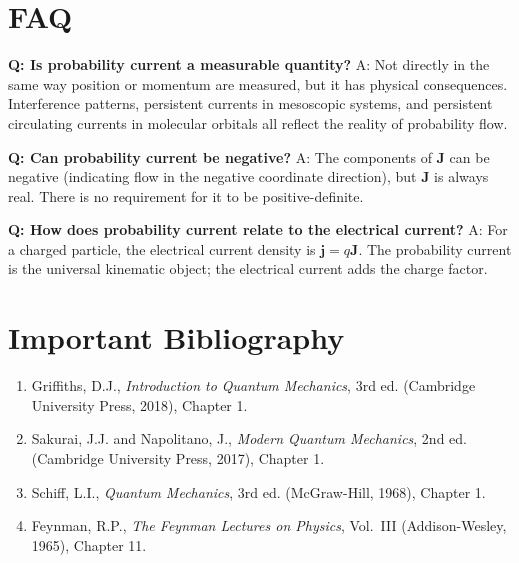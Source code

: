 \section*{FAQ}

\textbf{Q: Is probability current a measurable quantity?}
A: Not directly in the same way position or momentum are measured, but it has physical consequences. Interference patterns, persistent currents in mesoscopic systems, and persistent circulating currents in molecular orbitals all reflect the reality of probability flow.

\textbf{Q: Can probability current be negative?}
A: The components of $\mathbf{J}$ can be negative (indicating flow in the negative coordinate direction), but $\mathbf{J}$ is always real. There is no requirement for it to be positive-definite.

\textbf{Q: How does probability current relate to the electrical current?}
A: For a charged particle, the electrical current density is $\mathbf{j} = q\mathbf{J}$. The probability current is the universal kinematic object; the electrical current adds the charge factor.
\section*{Important Bibliography}

\begin{enumerate}
\item Griffiths, D.J., \textit{Introduction to Quantum Mechanics}, 3rd ed. (Cambridge University Press, 2018), Chapter 1.
\item Sakurai, J.J. and Napolitano, J., \textit{Modern Quantum Mechanics}, 2nd ed. (Cambridge University Press, 2017), Chapter 1.
\item Schiff, L.I., \textit{Quantum Mechanics}, 3rd ed. (McGraw-Hill, 1968), Chapter 1.
\item Feynman, R.P., \textit{The Feynman Lectures on Physics}, Vol.\ III (Addison-Wesley, 1965), Chapter 11.
\end{enumerate}

